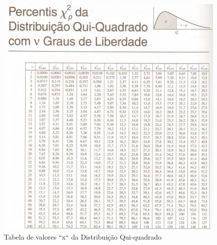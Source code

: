 \documentclass[
]{book}
\begin{document}
\begin{figure}

{\centering \includegraphics[width=1\linewidth]{images6/distQQ} 

}

\caption{Tabela de valores ``x`` da Distribuição Qui-quadrado}\label{fig:fig32}
\end{figure}
\end{document}
